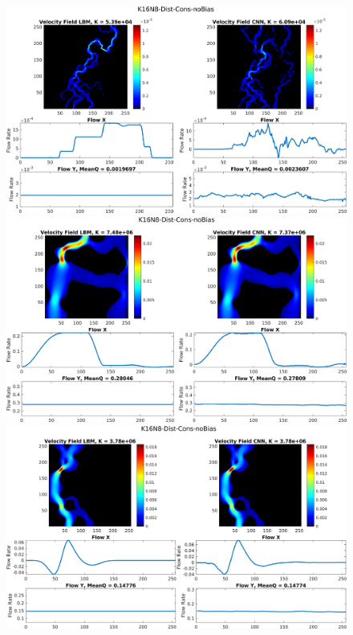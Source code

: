 \documentclass{article}
\begin{document}
\begin{figure}[htp!]
  \centering
  \begin{minipage}[b]{0.49\textwidth}
    \includegraphics[width=\textwidth]{figures/velCNNs494-6.png}
  \end{minipage}
  \hfill
  \begin{minipage}[b]{0.49\textwidth}
    \includegraphics[width=\textwidth]{figures/velCNNs365-6.png}
  \end{minipage}
    \begin{minipage}[b]{0.49\textwidth}
    \includegraphics[width=\textwidth]{figures/velCNNs1392-6.png}

\end{minipage}
\end{figure}
\end{document}
